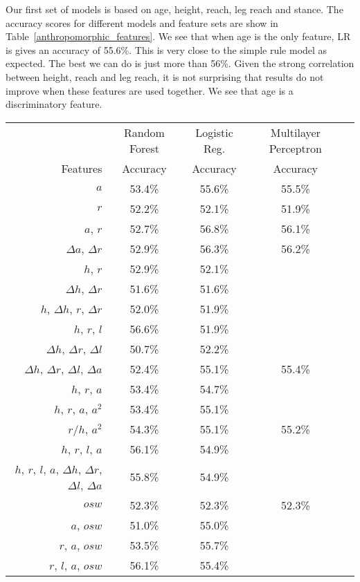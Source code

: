 Our first set of models is based on age, height,
reach, leg reach and stance. The accuracy scores
for different models and feature sets are show
in Table~\ref{anthropomorphic_features}.
We see that when age is the only feature, LR is gives
an accuracy of 55.6\%. This is very close to the simple
rule model as expected. The best we can do is just more than
56\%. Given the strong correlation between height, reach
and leg reach, it is not surprising that results do not
improve when these features are used together. We see that
age is a discriminatory feature.

\begin{center}
\begin{table}[h]
\begin{tabular}{r|cccc}
  \toprule
   & Random Forest & Logistic Reg. & Multilayer Perceptron \\
  Features & Accuracy & Accuracy& Accuracy \\
  \hline
  $a$ & 53.4\% & 55.6\% & 55.5\%\\
  $r$ & 52.2\% & 52.1\% & 51.9\%\\
  $a$, $r$ & 52.7\% & 56.8\% & 56.1\%\\
  $\Delta a$, $\Delta r$ & 52.9\% & 56.3\% & 56.2\%\\
  $h$, $r$ & 52.9\%  & 52.1\% & \\
  $\Delta h$, $\Delta r$ & 51.6\% & 51.6\%  &\\
  $h$, $\Delta h$, $r$, $\Delta r$ & 52.0\% & 51.9\%  &\\
  $h$, $r$, $l$ & 56.6\% & 51.9\% &  \\
  $\Delta h$, $\Delta r$, $\Delta l$ & 50.7\% & 52.2\%  &\\
  $\Delta h$, $\Delta r$, $\Delta l$, $\Delta a$ & 52.4\% & 55.1\% & 55.4\% \\
  $h$, $r$, $a$ & 53.4\% & 54.7\% &  \\
  $h$, $r$, $a$, $a^2$ & 53.4\% & 55.1\% &  \\
  $r/h$, $a^2$ & 54.3\% & 55.1\% & 55.2\%  \\
  $h$, $r$, $l$, $a$ & 56.1\% & 54.9\% &  \\
  $h$, $r$, $l$, $a$, $\Delta h$, $\Delta r$, $\Delta l$, $\Delta a$ & 55.8\% & 54.9\%  &\\
  $osw$ & 52.3\% & 52.3\% & 52.3\%\\
  $a$, $osw$ & 51.0\% & 55.0\% & \\
  $r$, $a$, $osw$ & 53.5\% & 55.7\% &  \\
  $r$, $l$, $a$, $osw$ & 56.1\% & 55.4\% & \\

\end{tabular}
\end{table}
\end{center}
